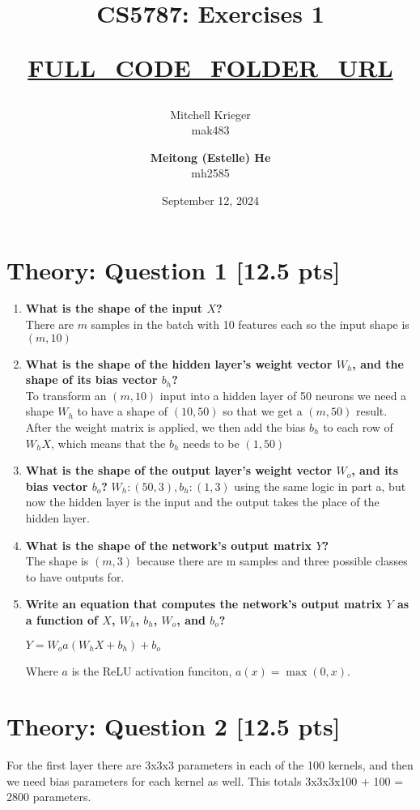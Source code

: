 \documentclass{article}
\title{CS5787: Exercises 1 \\ \begin{small}\url{FULL_CODE_FOLDER_URL}\end{small}}
\author{Mitchell Krieger \\ mak483 \and \textbf{Meitong (Estelle) He} \\ mh2585}
\date{September 12, 2024}
\begin{document}
\maketitle

\section{Theory: Question 1 [12.5 pts]}

\begin{enumerate}[label=\alph*.]
    \item \textbf{What is the shape of the input $X$?} \\ There are $m$ samples in the batch with 10 features each so the input shape is $(m, 10)$ 
    \item \textbf{What is the shape of the hidden layer's weight vector $W_h$, and the shape of its bias vector $b_h$?} \\ To transform an $(m, 10)$ input into a hidden layer of 50 neurons we need a shape $W_h$ to have a shape of $(10, 50)$ so that we get a $(m, 50)$ result. After the weight matrix is applied, we then add the bias $b_h$ to each row of $W_hX$, which means that the $b_h$ needs to be $(1, 50)$
    \item \textbf{What is the shape of the output layer's weight vector $W_o$, and its bias vector $b_o$?} $W_h: (50, 3), b_h: (1, 3)$ using the same logic in part a, but now the hidden layer is the input and the output takes the place of the hidden layer.
    \item \textbf{What is the shape of the network's output matrix $Y$?} \\ The shape is $(m, 3)$ because there are m samples and three possible classes to have outputs for.
    \item \textbf{Write an equation that computes the network's output matrix $Y$ as a function of $X$, $W_h$, $b_h$, $W_o$, and $b_o$?}
    
          $Y = W_oa(W_hX+b_h)+b_o$ 

          Where $a$ is the ReLU activation funciton, $a(x) = \max(0,x)$.
\end{enumerate}

\section{Theory: Question 2 [12.5 pts]}

For the first layer there are 3x3x3 parameters in each of the 100 kernels, and then we need bias parameters for each kernel as well. This totals 3x3x3x100 + 100 = 2800 parameters. 
\end{document}
